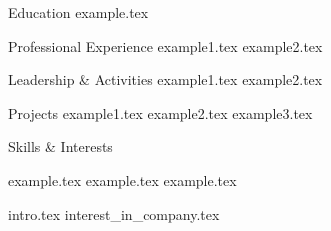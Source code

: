\documentclass[fontsize=11pt, cvmargins=0.5in, coverlettermargins=1in]{cv_template}
\begin{document}

\begin{cv}
\begin{cvsection}{Education}
    {example.tex}
\end{cvsection}

\begin{cvsection}{Professional Experience}
    {example1.tex}
    {example2.tex}
\end{cvsection}

\begin{cvsection}{Leadership \& Activities}
    {example1.tex}
    {example2.tex}
\end{cvsection}

\begin{cvsection}{Projects}
    {example1.tex}
    {example2.tex}
    {example3.tex}
\end{cvsection}

\begin{cvsection}{Skills \& Interests}
    \begin{cvlist}
        {example.tex}
        {example.tex}
        {example.tex}
    \end{cvlist}
\end{cvsection}
\end{cv}

\begin{coverletter}
    {intro.tex}
    \newline
    {interest_in_company.tex}
    \begin{contactdetails}
    \end{contactdetails}
\end{coverletter}
\end{document}
